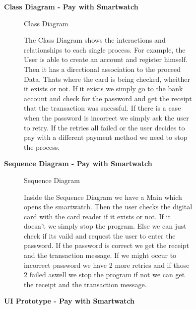 \documentclass{article}
\begin{document}
	\begin{figure}[htbp]
		\textbf{Class Diagram - Pay with Smartwatch}
		\centering
		\begin{subfigure}{\textwidth}
			\resizebox{\textwidth}{!}{}
			\caption{Class Diagram}
		\end{subfigure}
		\begin{subfigure}{\textwidth}
			The Class Diagram shows the interactions and relationships to each single process. For example, the User is
			able to create an account and register himself. Then it has a directional association to the proceed Data. Thats
			where the card is being checked, wheither it exists or not. If it exists we simply go to the bank account and check 
			for the password and get the receipt that the transaction was sucessful. If there is a case when the password is 
			incorrect we simply ask the user to retry. If the retries all failed or the user decides to pay with a different 
			payment method we need to stop the process. 
		\end{subfigure}
	\end{figure}
	\clearpage
	\begin{figure}[htbp]
		\textbf{Sequence Diagram - Pay with Smartwatch}
		\centering
		\begin{subfigure}{\textwidth}
			\resizebox{\textwidth}{!}{}
			\caption{Sequence Diagram}
		\end{subfigure}
		\begin{subfigure}{\textwidth}
			Inside the Sequence Diagram we have a Main which opens the smartwatch. Then the user checks the digital card with the 
			card reader if it exists or not. If it doesn't we simply stop the program. Else we can just check if its vaild and request the 
			user to enter the password. If the password is correct we get the receipt and the transaction message. If we might occur to incorrect 
			password we have 2 more retries and if those 2 failed aswell we stop the program if not we can get the receipt and the transaction
			message. 
		\end{subfigure}
	\end{figure}
	\clearpage
	\begin{figure}[htbp]
		\textbf{UI Prototype - Pay with Smartwatch}
		\centering
		\begin{subfigure}{\textwidth}
			\resizebox{\textwidth}{!}{}
		\end{subfigure}
		\begin{subfigure}{\textwidth}
		
		\end{subfigure}
	\end{figure}
	\clearpage
\end{document}
